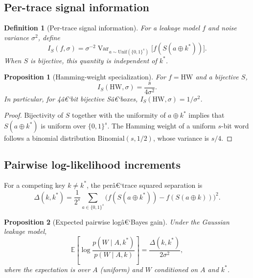 \documentclass[referee,lineno,pdflatex,sn-mathphys-num]{sn-jnl}
\theoremstyle{thmstylethree}
\newtheorem{definition}{Definition}[section]
\theoremstyle{thmstyletwo}
\theoremstyle{thmstyleone}
\newtheorem{proposition}{Proposition}[section]
\newcommand{\HW}{\mathrm{HW}}
\newcommand{\B}[1]{\{0,1\}^{#1}}
\begin{document}
\subsection{Per-trace signal information}\label{subsec:per-trace}

\begin{definition}[Per-trace signal information]\label{def:per-trace}
  For a leakage model $f$ and noise variance $\sigma^2$, define
  \begin{equation}\label{eq:per-trace-def}
    I_S(f,\sigma) = \sigma^{-2}
    \operatorname{Var}_{a\sim\mathrm{Unif}(\B{s})}\bigl[f(S(a\oplus k^*))\bigr].
  \end{equation}
  When $S$ is bijective, this quantity is independent of $k^*$.
\end{definition}

\begin{proposition}[Hamming-weight specialization]\label{thm:per-trace}
  For $f = \HW$ and a bijective $S$,
  \begin{equation}\label{eq:hw-info}
    I_S(\HW,\sigma) = \frac{s}{4\sigma^2}.
  \end{equation}
  In particular, for 4â€‘bit bijective Sâ€‘boxes, $I_S(\HW,\sigma)=1/\sigma^2$.
\end{proposition}

\begin{proof}
  Bijectivity of $S$ together with the uniformity of $a\oplus k^*$ implies that
  $S(a\oplus k^*)$ is uniform over $\B{s}$.  The Hamming weight of a uniform
  $s$-bit word follows a binomial distribution $\mathrm{Binomial}(s,1/2)$, whose
  variance is $s/4$.
\end{proof}

\subsection{Pairwise log-likelihood increments}\label{subsec:pairwise-llr}

For a competing key $k \neq k^*$, the perâ€‘trace squared separation is
\begin{equation}\label{eq:delta-k}
  \Delta(k,k^*) = \frac{1}{2^s} \sum_{a\in\B{s}}
  \bigl(f(S(a\oplus k^*)) - f(S(a\oplus k))\bigr)^2.
\end{equation}

\begin{proposition}[Expected pairwise logâ€‘Bayes gain]\label{prop:pairwise-gain}
  Under the Gaussian leakage model,
  \begin{equation}\label{eq:llr-gain}
    \mathbb E\left[\log\frac{p(W\mid A,k^*)}{p(W\mid A,k)}\right]
    = \frac{\Delta(k,k^*)}{2\sigma^2},
  \end{equation}
  where the expectation is over $A$ (uniform) and $W$ conditioned on $A$ and $k^*$.
\end{proposition}
\end{document}

